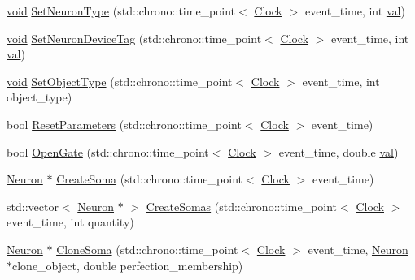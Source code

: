 \begin{DoxyCompactItemize}
\item 
\mbox{\hyperlink{glad_8h_a950fc91edb4504f62f1c577bf4727c29}{void}} \mbox{\hyperlink{class_neuron_afc685a0444425fceab6685a6ee004b65}{Set\+Neuron\+Type}} (std\+::chrono\+::time\+\_\+point$<$ \mbox{\hyperlink{universe_8h_a0ef8d951d1ca5ab3cfaf7ab4c7a6fd80}{Clock}} $>$ event\+\_\+time, int \mbox{\hyperlink{glad_8h_a26942fd2ed566ef553eae82d2c109c8f}{val}})
\item 
\mbox{\hyperlink{glad_8h_a950fc91edb4504f62f1c577bf4727c29}{void}} \mbox{\hyperlink{class_neuron_aa06d0f1a129e4a901a60e7343bc43533}{Set\+Neuron\+Device\+Tag}} (std\+::chrono\+::time\+\_\+point$<$ \mbox{\hyperlink{universe_8h_a0ef8d951d1ca5ab3cfaf7ab4c7a6fd80}{Clock}} $>$ event\+\_\+time, int \mbox{\hyperlink{glad_8h_a26942fd2ed566ef553eae82d2c109c8f}{val}})
\item 
\mbox{\hyperlink{glad_8h_a950fc91edb4504f62f1c577bf4727c29}{void}} \mbox{\hyperlink{class_neuron_ab371e2dacf2cdde8db5547b72fb45ca1}{Set\+Object\+Type}} (std\+::chrono\+::time\+\_\+point$<$ \mbox{\hyperlink{universe_8h_a0ef8d951d1ca5ab3cfaf7ab4c7a6fd80}{Clock}} $>$ event\+\_\+time, int object\+\_\+type)
\item 
bool \mbox{\hyperlink{class_neuron_a4c154fecb0b689d7da9d8d274f067ccf}{Reset\+Parameters}} (std\+::chrono\+::time\+\_\+point$<$ \mbox{\hyperlink{universe_8h_a0ef8d951d1ca5ab3cfaf7ab4c7a6fd80}{Clock}} $>$ event\+\_\+time)
\item 
bool \mbox{\hyperlink{class_neuron_a82d0a4739244d79ff929be01eeb0be28}{Open\+Gate}} (std\+::chrono\+::time\+\_\+point$<$ \mbox{\hyperlink{universe_8h_a0ef8d951d1ca5ab3cfaf7ab4c7a6fd80}{Clock}} $>$ event\+\_\+time, double \mbox{\hyperlink{glad_8h_a26942fd2ed566ef553eae82d2c109c8f}{val}})
\item 
\mbox{\hyperlink{class_neuron}{Neuron}} $\ast$ \mbox{\hyperlink{class_neuron_a32593a869b25c778c1856c36704f49cf}{Create\+Soma}} (std\+::chrono\+::time\+\_\+point$<$ \mbox{\hyperlink{universe_8h_a0ef8d951d1ca5ab3cfaf7ab4c7a6fd80}{Clock}} $>$ event\+\_\+time)
\item 
std\+::vector$<$ \mbox{\hyperlink{class_neuron}{Neuron}} $\ast$ $>$ \mbox{\hyperlink{class_neuron_a2016d83b02bfe9e5548d5c24ef31dded}{Create\+Somas}} (std\+::chrono\+::time\+\_\+point$<$ \mbox{\hyperlink{universe_8h_a0ef8d951d1ca5ab3cfaf7ab4c7a6fd80}{Clock}} $>$ event\+\_\+time, int quantity)
\item 
\mbox{\hyperlink{class_neuron}{Neuron}} $\ast$ \mbox{\hyperlink{class_neuron_a7706e0f722c70138458423c07b6b153b}{Clone\+Soma}} (std\+::chrono\+::time\+\_\+point$<$ \mbox{\hyperlink{universe_8h_a0ef8d951d1ca5ab3cfaf7ab4c7a6fd80}{Clock}} $>$ event\+\_\+time, \mbox{\hyperlink{class_neuron}{Neuron}} $\ast$clone\+\_\+object, double perfection\+\_\+membership)

\end{DoxyCompactItemize}
